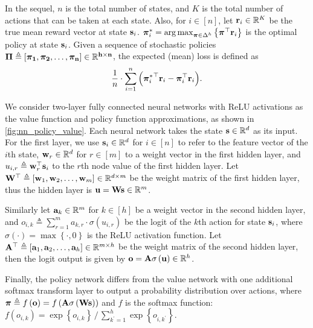In the sequel, $n$ is the total number of states, and $K$ is the total number of actions that can be taken at each state.
Also, for $i\in[n]$, let ${\mathbf{r}}_i \in {\mathbb{R}}^K$ be the true mean reward vector at state ${\mathbf{s}}_i$. ${\boldsymbol{\pi}}_i^* = \operatorname*{arg\,max}_{{\boldsymbol{\pi}} \in \Delta^{h}}{\left\{ {\boldsymbol{\pi}}^\top {\mathbf{r}}_i \right\}}$ is the optimal policy at state ${\mathbf{s}}_i$. Given a sequence of stochastic policies $\bf{\Pi} \triangleq \left[ {\boldsymbol{\pi}}_1, {\boldsymbol{\pi}}_2, \dots, {\boldsymbol{\pi}}_n \right] \in {{\mathbb{R}}}^{h \times n}$, the expected (mean) loss is defined as
\begin{equation}
\label{eq:expected_loss}
\begin{split}
\frac{1}{n} \cdot \sum\limits_{i=1}^{n}{ \left( {{\boldsymbol{\pi}}_i^*}^\top {\mathbf{r}}_i - {\boldsymbol{\pi}}_i^\top {\mathbf{r}}_i \right) }.
\end{split}
\end{equation}

We consider two-layer fully connected neural networks with ReLU activations as the value function and policy function approximations, as shown in \cref{fig:nn_policy_value}. 
Each neural network takes the state ${\mathbf{s}} \in {\mathbb{R}}^d$ as its input.
For the first layer, we use ${\mathbf{s}}_i \in {\mathbb{R}}^d$ for $i \in [n]$ to refer to the feature vector of the $i$th state, ${\mathbf{w}}_r \in {\mathbb{R}}^d$ for $r \in [m]$ to a weight vector in the first hidden layer, and $u_{i,r} \triangleq {\mathbf{w}}_r^\top {\mathbf{s}}_i$ to the $r$th node value of the first hidden layer.
Let ${\mathbf{W}}^\top \triangleq \left[ {\mathbf{w}}_1, {\mathbf{w}}_2, \dots, {\mathbf{w}}_m \right] \in {\mathbb{R}}^{d \times m}$ be the weight matrix of the first hidden layer, thus the hidden layer is ${\mathbf{u}} = {\mathbf{W}}{\mathbf{s}}\in{\mathbb{R}}^m$.

Similarly let ${\mathbf{a}}_k \in {\mathbb{R}}^m$ for $k \in [h]$ be a weight vector in the second hidden layer, and $o_{i,k} \triangleq \sum_{r=1}^{m}{a_{k,r} \cdot \sigma\left( u_{i,r} \right)}$ be the logit of the $k$th action for state ${\mathbf{s}}_i$, where $\sigma(\cdot) = \max\left\{ \cdot, 0 \right\}$ is the ReLU activation function. 
Let ${\mathbf{A}}^\top \triangleq \left[ {\mathbf{a}}_1, {\mathbf{a}}_2, \dots, {\mathbf{a}}_h \right] \in {\mathbb{R}}^{m \times h}$ be the weight matrix of the second hidden layer, then the logit output is given by ${\mathbf{o}} = {\mathbf{A}}\sigma\left( {\mathbf{u}}\right) \in {\mathbb{R}}^h$.

Finally, the policy network differs from the value network with one additional softmax transform layer to output a probability distribution over actions, where ${\boldsymbol{\pi}} \triangleq f\left( {\mathbf{o}} \right) = f\left( {\mathbf{A}} \sigma\left( {\mathbf{W}} {\mathbf{s}} \right) \right)$ and $f$ is the softmax function: $f\left( o_{i,k} \right) = \exp\left\{ o_{i,k} \right\} \,/\, \sum_{k^\prime = 1}^{h}{\exp\left\{ o_{i,k^\prime} \right\}}$.
